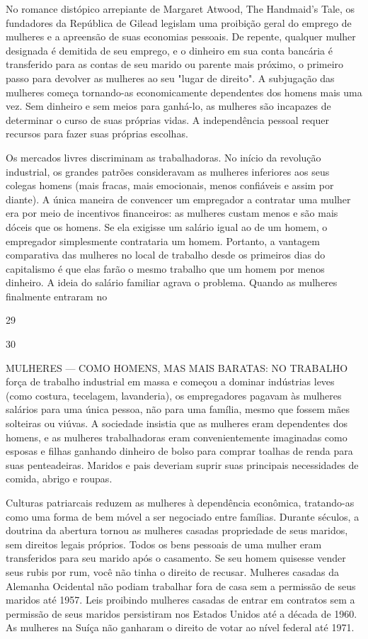  \par 
No romance distópico arrepiante de Margaret Atwood, The Handmaid's Tale, os fundadores da República de Gilead legislam uma proibição geral do emprego de mulheres e a apreensão de suas economias pessoais. De repente, qualquer mulher designada é demitida de seu emprego, e o dinheiro em sua conta bancária é transferido para as contas de seu marido ou parente mais próximo, o primeiro passo para devolver as mulheres ao seu "lugar de direito". A subjugação das mulheres começa tornando-as economicamente dependentes dos homens mais uma vez. Sem dinheiro e sem meios para ganhá-lo, as mulheres são incapazes de determinar o curso de suas próprias vidas. A independência pessoal requer recursos para fazer suas próprias escolhas.
 \par 
Os mercados livres discriminam as trabalhadoras. No início da revolução industrial, os grandes patrões consideravam as mulheres inferiores aos seus colegas homens (mais fracas, mais emocionais, menos confiáveis ​​e assim por diante). A única maneira de convencer um empregador a contratar uma mulher era por meio de incentivos financeiros: as mulheres custam menos e são mais dóceis que os homens. Se ela exigisse um salário igual ao de um homem, o empregador simplesmente contrataria um homem. Portanto, a vantagem comparativa das mulheres no local de trabalho desde os primeiros dias do capitalismo é que elas farão o mesmo trabalho que um homem por menos dinheiro. A ideia do salário familiar agrava o problema. Quando as mulheres finalmente entraram no
 \par 
29
 \par 
30
 \par 
MULHERES — COMO HOMENS, MAS MAIS BARATAS: NO TRABALHO força de trabalho industrial em massa e começou a dominar indústrias leves (como costura, tecelagem, lavanderia), os empregadores pagavam às mulheres salários para uma única pessoa, não para uma família, mesmo que fossem mães solteiras ou viúvas. A sociedade insistia que as mulheres eram dependentes dos homens, e as mulheres trabalhadoras eram convenientemente imaginadas como esposas e filhas ganhando dinheiro de bolso para comprar toalhas de renda para suas penteadeiras. Maridos e pais deveriam suprir suas principais necessidades de comida, abrigo e roupas.
 \par 
Culturas patriarcais reduzem as mulheres à dependência econômica, tratando-as como uma forma de bem móvel a ser negociado entre famílias. Durante séculos, a doutrina da abertura tornou as mulheres casadas propriedade de seus maridos, sem direitos legais próprios. Todos os bens pessoais de uma mulher eram transferidos para seu marido após o casamento. Se seu homem quisesse vender seus rubis por rum, você não tinha o direito de recusar. Mulheres casadas da Alemanha Ocidental não podiam trabalhar fora de casa sem a permissão de seus maridos até 1957. Leis proibindo mulheres casadas de entrar em contratos sem a permissão de seus maridos persistiram nos Estados Unidos até a década de 1960. As mulheres na Suíça não ganharam o direito de votar ao nível federal até 1971.

